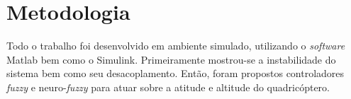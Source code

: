 \chapter{Metodologia}
\label{chap:metodologia}

Todo o trabalho foi desenvolvido em ambiente simulado, utilizando o \textit{software} Matlab\textsuperscript{\textregistered} bem como o Simulink\textsuperscript{\textregistered}. Primeiramente mostrou-se a instabilidade do sistema bem como seu desacoplamento. Então, foram propostos controladores \textit{fuzzy} e neuro-\textit{fuzzy} para atuar sobre a atitude e altitude do quadricóptero.




